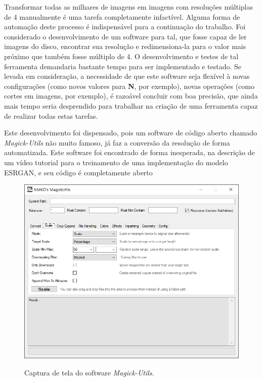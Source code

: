 Transformar todas as milhares de imagens em imagens com resoluções múltiplas de 4 manualmente é uma tarefa completamente infactível. Alguma forma de automação deste processo é indispensável para a continuação do trabalho. Foi considerado o desenvolvimento de um software para tal, que fosse capaz de ler imagens do disco, encontrar sua resolução e redimensiona-la para o valor mais próximo que também fosse múltiplo de 4. O desenvolvimento e testes de tal ferramenta demandaria bastante tempo para ser implementado e testado. Se levada em consideração, a necessidade de que este software seja flexível à novas configurações (como novos valores para \textbf{N}, por exemplo), novas operações (como cortes em imagens, por exemplo), é razoável concluir com boa precisão, que ainda mais tempo seria desprendido para trabalhar na criação de uma ferramenta capaz de realizar todas estas tarefas.

Este desenvolvimento foi dispensado, pois um software de código aberto chamado \textit{Magick-Utils} não muito famoso, já faz a conversão da resolução de forma automatizada. Este software foi encontrado de forma inesperada, na descrição de um vídeo tutorial para o treinamento de uma implementação do modelo ESRGAN, e seu código é completamente aberto

\begin{figure}[H]
    \centering
    \caption{Captura de tela do software \textit{Magick-Utils}.}
    \includegraphics[width=14cm]{fig/magick-utils.png}
    \label{fig:fig22}
\end{figure}

